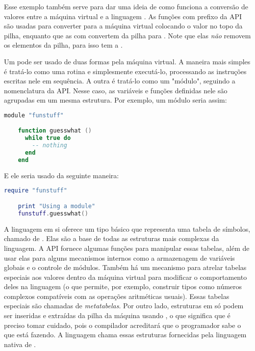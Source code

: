       Esse exemplo também serve para dar uma ideia de como funciona a conversão
      de valores entre a máquina virtual  e a linguagem
      \C{}\footnotemark{}. As funções com prefixo  da API
      são usadas para converter para a máquina virtual colocando o valor no topo
      da pilha, enquanto que as com  convertem da pilha para
      \C{}. Note que elas \emph{não} removem os elementos da pilha, para isso
      tem a .


      Um \script{}  pode ser usado de duas formas pela máquina
      virtual. A maneira mais simples é tratá-lo como uma rotina e simplesmente
      executá-lo, processando as instruções escritas nele em sequência. A outra
      é tratá-lo como um "módulo", seguindo a nomenclatura da API. Nesse caso,
      as variáveis e funções definidas nele são agrupadas em um mesma estrutura.
      Por exemplo, um módulo seria assim:

    \begin{lstlisting}[language=lua]
    module "funstuff"

    function guesswhat ()
      while true do
        -- nothing
      end
    end

    \end{lstlisting}

      E ele seria usado da seguinte maneira:

    \begin{lstlisting}[language=lua]
    require "funstuff"

    print "Using a module"
    funstuff.guesswhat()
    \end{lstlisting}

      A linguagem  em si oferece um tipo básico que representa uma
      tabela de símbolos\footnotemark{}, chamado de . Elas são a
      base de todas as estruturas mais complexas da linguagem. A API fornece
      algumas funções para manipular essas tabelas, além de usar elas para
      alguns mecanismos internos como a armazenagem de variáveis globais e o
      controle de módulos. Também há um mecanismo para atrelar tabelas
      especiais aos valores dentro da máquina virtual para modificar o
      comportamento deles na linguagem (o que permite, por exemplo, construir
      tipos como números complexos compatíveis com as operações aritméticas
      usuais). Essas tabelas especiais são chamadas de \emph{metatabelas}.
      Por outro lado, estruturas em \C{} só podem ser inseridas e extraídas da
      pilha da máquina usando , o que significa que é preciso tomar
      cuidado, pois o compilador acreditará que o programador sabe o que está
      fazendo. A linguagem chama essas estruturas fornecidas pela linguagem
      nativa de .

